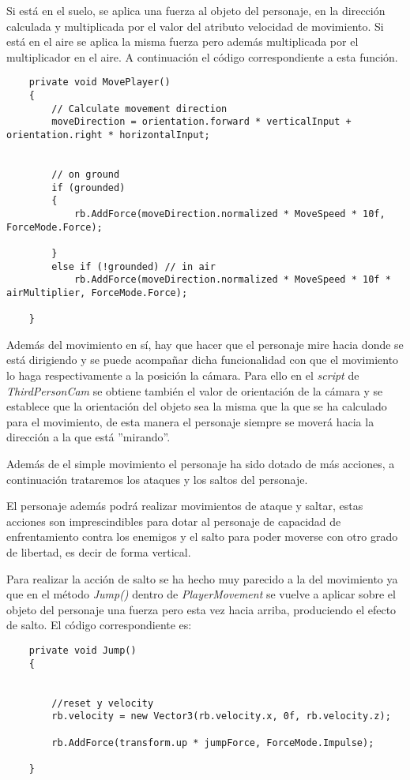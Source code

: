 Si está en el suelo, se aplica una fuerza al objeto del personaje, en la dirección calculada y multiplicada por el valor del atributo velocidad de movimiento. Si está en el aire se aplica la misma fuerza pero además multiplicada por el multiplicador en el aire. A continuación el código correspondiente a esta función. 

\begin{lstlisting}
    private void MovePlayer()
    {
        // Calculate movement direction
        moveDirection = orientation.forward * verticalInput + orientation.right * horizontalInput;


        // on ground 
        if (grounded) 
        { 
            rb.AddForce(moveDirection.normalized * MoveSpeed * 10f, ForceMode.Force);

        }
        else if (!grounded) // in air
            rb.AddForce(moveDirection.normalized * MoveSpeed * 10f * airMultiplier, ForceMode.Force);

    }
    \end{lstlisting}

    Además del movimiento en sí, hay que hacer que el personaje mire hacia donde se está dirigiendo y se puede acompañar dicha funcionalidad con que el movimiento lo haga respectivamente a la posición la cámara. Para ello en el \textit{script} de \textit{ThirdPersonCam} se obtiene también el valor de orientación de la cámara y se establece que la orientación del objeto sea la misma que la que se ha calculado para el movimiento, de esta manera el personaje siempre se moverá hacia la dirección a la que está ''mirando''.

    Además de el simple movimiento el personaje ha sido dotado de más acciones, a continuación trataremos los ataques y los saltos del personaje.

    El personaje además podrá realizar movimientos de ataque y saltar, estas acciones son imprescindibles para dotar al personaje de capacidad de enfrentamiento contra los enemigos y el salto para poder moverse con otro grado de libertad, es decir de forma vertical.

    Para realizar la acción de salto se ha hecho muy parecido a la del movimiento ya que en el método \textit{Jump()} dentro de \textit{PlayerMovement} se vuelve a aplicar sobre el objeto del personaje una fuerza pero esta vez hacia arriba, produciendo el efecto de salto. El código correspondiente es: 
    
\begin{lstlisting}
    private void Jump()
    {

        
        //reset y velocity
        rb.velocity = new Vector3(rb.velocity.x, 0f, rb.velocity.z);

        rb.AddForce(transform.up * jumpForce, ForceMode.Impulse);
       
    }
\end{lstlisting}

